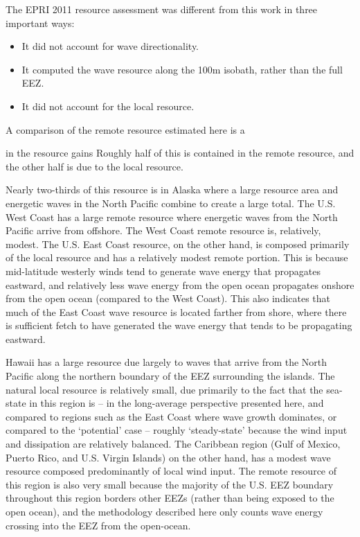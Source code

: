 The EPRI 2011 resource assessment was different from this work in three important ways:
\begin{itemize}
\item It did not account for wave directionality.
\item It computed the wave resource along the 100m isobath, rather than the full EEZ.
\item It did not account for the local resource.
\end{itemize}
A comparison of the remote resource estimated here is a 

in the resource gains Roughly half of this is contained in the remote resource, and the other half is due to the local resource. 

Nearly two-thirds of this resource is in Alaska where a large resource area and energetic waves in the North Pacific combine to create a large total. The U.S. West Coast has a large remote resource where energetic waves from the North Pacific arrive from offshore.  The West Coast remote resource is, relatively, modest. The U.S. East Coast resource, on the other hand, is composed primarily of the local resource and has a relatively modest remote portion. This is because mid-latitude westerly winds tend to generate wave energy that propagates eastward, and relatively less wave energy from the open ocean propagates onshore from the open ocean (compared to the West Coast). This also indicates that much of the East Coast wave resource is located farther from shore, where there is sufficient fetch to have generated the wave energy that tends to be propagating eastward. 

Hawaii has a large resource due largely to waves that arrive from the North Pacific along the northern boundary of the EEZ surrounding the islands. The natural local resource is relatively small, due primarily to the fact that the sea-state in this region is -- in the long-average perspective presented here, and compared to regions such as the East Coast where wave growth dominates, or compared to the `potential' case -- roughly `steady-state' because the wind input and dissipation are relatively balanced. The Caribbean region (Gulf of Mexico, Puerto Rico, and U.S. Virgin Islands) on the other hand, has a modest wave resource composed predominantly of local wind input.  The remote resource of this region is also very small because the majority of the U.S. EEZ boundary throughout this region borders other EEZs (rather than being exposed to the open ocean), and the methodology described here only counts wave energy crossing into the EEZ from the open-ocean.

